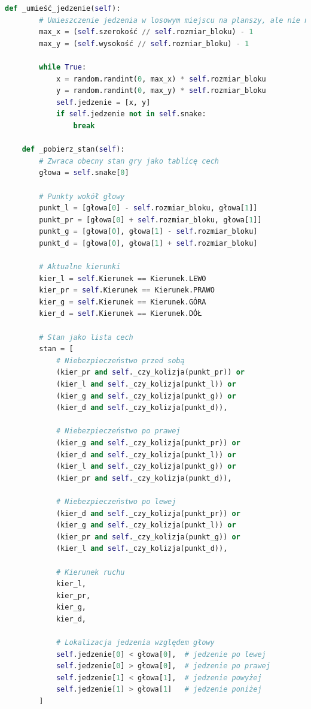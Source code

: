 \documentclass[a4paper,12pt]{article}
\begin{document}
\begin{lstlisting}[language=Python]
    def _umieść_jedzenie(self):
        # Umieszczenie jedzenia w losowym miejscu na planszy, ale nie na wężu
        max_x = (self.szerokość // self.rozmiar_bloku) - 1
        max_y = (self.wysokość // self.rozmiar_bloku) - 1
        
        while True:
            x = random.randint(0, max_x) * self.rozmiar_bloku
            y = random.randint(0, max_y) * self.rozmiar_bloku
            self.jedzenie = [x, y]
            if self.jedzenie not in self.snake:
                break
    
    def _pobierz_stan(self):
        # Zwraca obecny stan gry jako tablicę cech
        głowa = self.snake[0]
        
        # Punkty wokół głowy
        punkt_l = [głowa[0] - self.rozmiar_bloku, głowa[1]]
        punkt_pr = [głowa[0] + self.rozmiar_bloku, głowa[1]]
        punkt_g = [głowa[0], głowa[1] - self.rozmiar_bloku]
        punkt_d = [głowa[0], głowa[1] + self.rozmiar_bloku]
        
        # Aktualne kierunki
        kier_l = self.Kierunek == Kierunek.LEWO
        kier_pr = self.Kierunek == Kierunek.PRAWO
        kier_g = self.Kierunek == Kierunek.GÓRA
        kier_d = self.Kierunek == Kierunek.DÓŁ
        
        # Stan jako lista cech
        stan = [
            # Niebezpieczeństwo przed sobą
            (kier_pr and self._czy_kolizja(punkt_pr)) or
            (kier_l and self._czy_kolizja(punkt_l)) or
            (kier_g and self._czy_kolizja(punkt_g)) or
            (kier_d and self._czy_kolizja(punkt_d)),
            
            # Niebezpieczeństwo po prawej
            (kier_g and self._czy_kolizja(punkt_pr)) or
            (kier_d and self._czy_kolizja(punkt_l)) or
            (kier_l and self._czy_kolizja(punkt_g)) or
            (kier_pr and self._czy_kolizja(punkt_d)),
            
            # Niebezpieczeństwo po lewej
            (kier_d and self._czy_kolizja(punkt_pr)) or
            (kier_g and self._czy_kolizja(punkt_l)) or
            (kier_pr and self._czy_kolizja(punkt_g)) or
            (kier_l and self._czy_kolizja(punkt_d)),
            
            # Kierunek ruchu
            kier_l,
            kier_pr,
            kier_g,
            kier_d,
            
            # Lokalizacja jedzenia względem głowy
            self.jedzenie[0] < głowa[0],  # jedzenie po lewej
            self.jedzenie[0] > głowa[0],  # jedzenie po prawej
            self.jedzenie[1] < głowa[1],  # jedzenie powyżej
            self.jedzenie[1] > głowa[1]   # jedzenie poniżej
        ]
        

\end{lstlisting}
\end{document}
